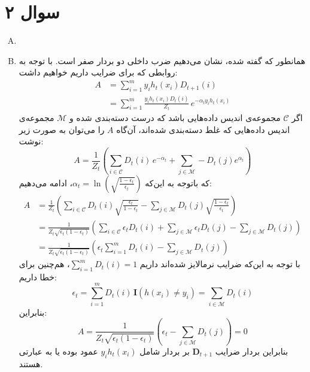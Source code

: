 \documentclass[a4paper, 12pt]{article}
\begin{document}
\section*{سوال ۲}
\begin{enumerate}[A)]
	\item {}
	\item
	همانطور که گفته شده، نشان می‌دهیم ضرب داخلی دو بردار صفر است. با توجه به روابطی که برای ضرایب داریم خواهیم داشت:
	\[
	\begin{aligned}
		A &= \sum_{i=1}^m y_ih_t(x_i)D_{t+1}(i) \\[0.6em]
		&= \sum_{i=1}^m \frac{y_ih_t(x_i)D_t(i)}{Z_t} \, e^{-\alpha_ty_ih_t(x_i)}
	\end{aligned}
	\]
	اگر $\mathcal{C}$ مجموعه‌ی اندیس داده‌هایی باشد که درست دسته‌بندی شده و $\mathcal{M}$ مجموعه‌ی اندیس داده‌هایی که غلط دسته‌بندی شده‌اند، آن‌گاه $A$ را می‌توان به صورت زیر نوشت:
	\[
	A = \frac{1}{Z_t} \left(\sum_{i\in \mathcal{C}}D_t(i)\,e^{-\alpha_t} + \sum_{j\in \mathcal{M}} -D_t(j)e^{\alpha_t}\right)
	\]
	که باتوجه به این‌که 
	$\alpha_t = \ln(\sqrt{\frac{1-\epsilon_t}{\epsilon_t}})$،
	ادامه می‌دهیم:
	\[
	\begin{aligned}
		A &= \frac{1}{Z_t} \left(\sum_{i\in \mathcal{C}} D_t(i) \sqrt{\frac{\epsilon_t}{1-\epsilon_t}} - \sum_{j\in \mathcal{M}} D_t(j) \sqrt{\frac{1 - \epsilon_t}{\epsilon_t}}\right) \\[0.7em]
		&= \frac{1}{Z_t\sqrt{\epsilon_t(1-\epsilon_t)}} \left(\sum_{i\in \mathcal{C}} \epsilon_t D_t(i) + \sum_{j\in \mathcal{M}} \epsilon_t D_t(j) - \sum_{j\in \mathcal{M}} D_t(j)\right) \\[0.7em]
		&= \frac{1}{Z_t\sqrt{\epsilon_t(1-\epsilon_t)}} \left(\epsilon_t \sum_{i=1}^m D_t(i) - \sum_{j\in \mathcal{M}} D_t(j)\right)
	\end{aligned}
	\]
	با توجه به این‌که ضرایب نرمالایز شده‌اند داریم 
	$\sum_{i=1}^m D_t(i) = 1$،
	هم‌چنین برای خطا داریم:
	\[
	\epsilon_t = \sum_{i=1}^m D_t(i)\,\bm{I}(h(x_i) \ne y_i) = \sum_{i\in \mathcal{M}} D_t(i)
	\]
	بنابراین:
	\[
	A = \frac{1}{Z_t\sqrt{\epsilon_t(1-\epsilon_t)}} \left(\epsilon_t - \sum_{j\in \mathcal{M}}D_t(j) \right) = 0
	\]
	بنابراین بردار ضرایب
	$\bm{D}_{t+1}$
	بر بردار شامل
	$y_ih_t(x_i)$
	عمود بوده یا به عبارتی  هستند.
\end{enumerate}
\pagebreak
\end{document}
